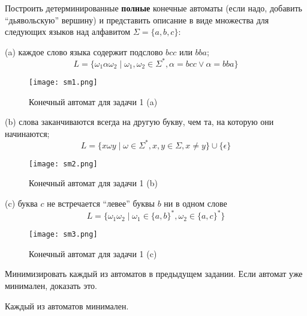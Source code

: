 
\graphicspath{{../1/}{../3/}}


\begin{problem}
Построить детерминированные \textbf{полные} конечные автоматы 
(если надо, добавить “дьявольскую” вершину) и 
представить описание в виде множества для 
следующих языков над алфавитом $\Sigma = \{a, b, c\}$:
\end{problem}

(a) каждое слово языка содержит подслово $bcc$ или $bba$;
$$
    L = \{\omega_1\alpha\omega_2 \mid \omega_1, \omega_2 \in \Sigma^*, \alpha=bcc \lor \alpha = bba \}
$$
\begin{figure}[h]
    \texttt{[image: sm1.png]}
    \caption{Конечный автомат для задачи 1 (a)}
\end{figure}

(b) слова заканчиваются всегда на другую букву, чем та, на которую они начинаются;
$$
    L = \{x \omega y \mid \omega \in \Sigma^*, x, y \in \Sigma, x \ne y \} \cup \{\epsilon\}
$$
\begin{figure}[h]
    \texttt{[image: sm2.png]}
    \caption{Конечный автомат для задачи 1 (b)}
\end{figure}

(c) буква $c$ не встречается “левее” буквы $b$ ни в одном слове
$$
    L = \{\omega_1\omega_2 \mid \omega_1 \in \{a, b\}^*,
    \omega_2 \in \{a, c\}^* \}
$$
\begin{figure}[h]
    \texttt{[image: sm3.png]}
    \caption{Конечный автомат для задачи 1 (c)}
\end{figure}

\begin{problem}
    Минимизировать каждый из автоматов в предыдущем задании. Если автомат уже
    минимален, доказать это.
\end{problem}

Каждый из автоматов минимален. 

